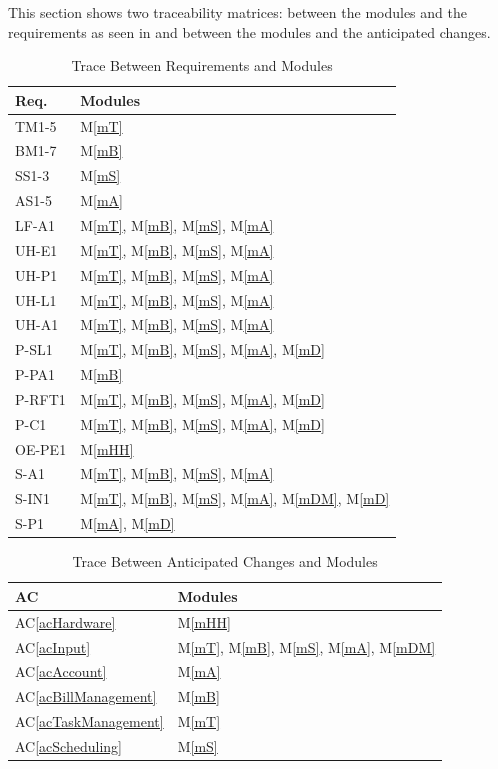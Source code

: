 \documentclass[12pt, titlepage]{article}
\newcommand{\acref}[1]{AC\ref{#1}}
\newcommand{\mref}[1]{M\ref{#1}}
\begin{document}
This section shows two traceability matrices: between the modules and the requirements as seen in \citep{SRS} and between the modules and the anticipated changes.

\begin{table}[H]
\centering
\begin{tabular}{p{} p{}}
\toprule
\textbf{Req.} & \textbf{Modules}\\
\midrule
TM1-5 & \mref{mT}\\
BM1-7 & \mref{mB}\\
SS1-3 & \mref{mS}\\
AS1-5 & \mref{mA}\\
LF-A1 & \mref{mT}, \mref{mB}, \mref{mS}, \mref{mA}\\
UH-E1 & \mref{mT}, \mref{mB}, \mref{mS}, \mref{mA}\\
UH-P1 & \mref{mT}, \mref{mB}, \mref{mS}, \mref{mA}\\
UH-L1 & \mref{mT}, \mref{mB}, \mref{mS}, \mref{mA}\\
UH-A1 & \mref{mT}, \mref{mB}, \mref{mS}, \mref{mA}\\
P-SL1 & \mref{mT}, \mref{mB}, \mref{mS}, \mref{mA}, \mref{mD}\\
P-PA1 & \mref{mB}\\
P-RFT1 & \mref{mT}, \mref{mB}, \mref{mS}, \mref{mA}, \mref{mD}\\
P-C1 & \mref{mT}, \mref{mB}, \mref{mS}, \mref{mA}, \mref{mD}\\
OE-PE1 & \mref{mHH}\\
S-A1 & \mref{mT}, \mref{mB}, \mref{mS}, \mref{mA}\\
S-IN1 & \mref{mT}, \mref{mB}, \mref{mS}, \mref{mA}, \mref{mDM}, \mref{mD}\\
S-P1 & \mref{mA}, \mref{mD}\\
\bottomrule
\end{tabular}
\caption{Trace Between Requirements and Modules}
\label{TblRT}
\end{table}

\begin{table}[H]
\centering
\begin{tabular}{p{} p{}}
\toprule
\textbf{AC} & \textbf{Modules}\\
\midrule
\acref{acHardware} & \mref{mHH}\\
\acref{acInput} & \mref{mT}, \mref{mB}, \mref{mS}, \mref{mA}, \mref{mDM}\\
\acref{acAccount} & \mref{mA}\\
\acref{acBillManagement} & \mref{mB}\\
\acref{acTaskManagement} & \mref{mT}\\
\acref{acScheduling} & \mref{mS}\\
\bottomrule
\end{tabular}
\caption{Trace Between Anticipated Changes and Modules}
\label{TblACT}
\end{table}
\end{document}
